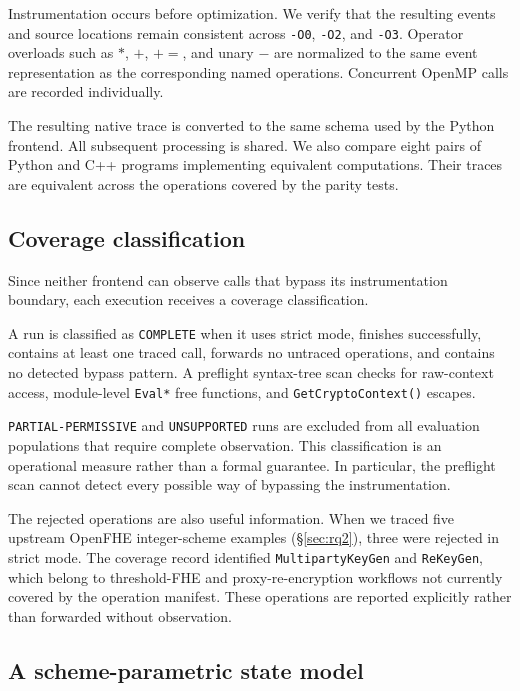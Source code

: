 \documentclass[sigconf,nonacm]{acmart}
\begin{document}
Instrumentation occurs before optimization. We verify that the resulting
events and source locations remain consistent across \texttt{-O0},
\texttt{-O2}, and \texttt{-O3}. Operator overloads such as $*$, $+$, $+{=}$,
and unary $-$ are normalized to the same event representation as the
corresponding named operations. Concurrent OpenMP calls are recorded
individually.

The resulting native trace is converted to the same schema used by the Python
frontend. All subsequent processing is shared. We also compare eight pairs of
Python and C++ programs implementing equivalent computations. Their traces are
equivalent across the operations covered by the parity tests.

\subsection{Coverage classification}
\label{sec:coverage}

Since neither frontend can observe calls that bypass its instrumentation
boundary, each execution receives a coverage classification.

A run is classified as \texttt{COMPLETE} when it uses strict mode, finishes
successfully, contains at least one traced call, forwards no untraced
operations, and contains no detected bypass pattern. A preflight syntax-tree
scan checks for raw-context access, module-level \texttt{Eval*} free
functions, and \texttt{GetCryptoContext()} escapes.

\texttt{PARTIAL-PERMISSIVE} and \texttt{UNSUPPORTED} runs are excluded from
all evaluation populations that require complete observation. This
classification is an operational measure rather than a formal guarantee. In
particular, the preflight scan cannot detect every possible way of bypassing
the instrumentation.

The rejected operations are also useful information. When we traced five
upstream OpenFHE integer-scheme examples (\S\ref{sec:rq2}), three were
rejected in strict mode. The coverage record identified
\texttt{MultipartyKeyGen} and \texttt{ReKeyGen}, which belong to
threshold-FHE and proxy-re-encryption workflows not currently covered by the
operation manifest. These operations are reported explicitly rather than
forwarded without observation.

\subsection{A scheme-parametric state model}
\label{sec:scheme}
\end{document}
